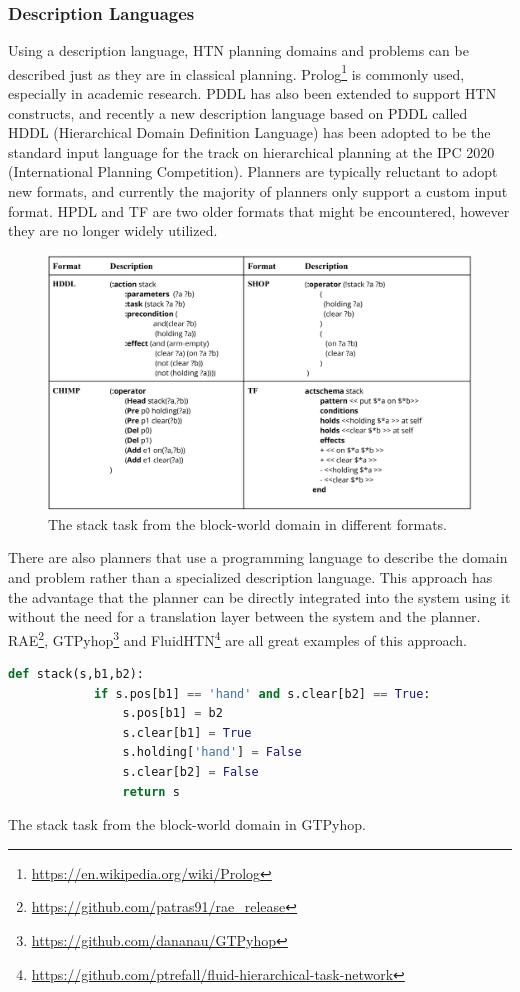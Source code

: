 \subsubsection{Description Languages}
Using a description language, HTN planning domains and problems can be described just as they are in classical planning. Prolog\footnote{\url{https://en.wikipedia.org/wiki/Prolog}} is commonly used, especially in academic research. PDDL has also been extended to support HTN constructs, and recently a new description language based on PDDL called HDDL (Hierarchical Domain Definition Language) has been adopted to be the standard input language for the track on hierarchical planning at the IPC 2020 (International Planning Competition). Planners are typically reluctant to adopt new formats, and currently the majority of planners only support a custom input format. HPDL and TF are two older formats that might be encountered, however they are no longer widely utilized. 

\begin{figure}[h]
    \centering
    \includegraphics[width=\textwidth]{graphics/formats.png}
    \caption{The stack task from the block-world domain in different formats.}
    \label{fig:formats}
\end{figure}

There are also planners that use a programming language to describe the domain and problem rather than a specialized description language. This approach has the advantage that the planner can be directly integrated into the system using it without the need for a translation layer between the system and the planner. RAE\footnote{\url{https://github.com/patras91/rae_release}}, GTPyhop\footnote{\url{https://github.com/dananau/GTPyhop}} and FluidHTN\footnote{\url{https://github.com/ptrefall/fluid-hierarchical-task-network}} are all great examples of this approach.

\begin{Listing}
    \begin{lstlisting}[language=Python]
        def stack(s,b1,b2):
            if s.pos[b1] == 'hand' and s.clear[b2] == True:
                s.pos[b1] = b2
                s.clear[b1] = True
                s.holding['hand'] = False
                s.clear[b2] = False
                return s
    \end{lstlisting}
    \caption{The stack task from the block-world domain in GTPyhop.}
    \label{lst:StackPython}
\end{Listing}